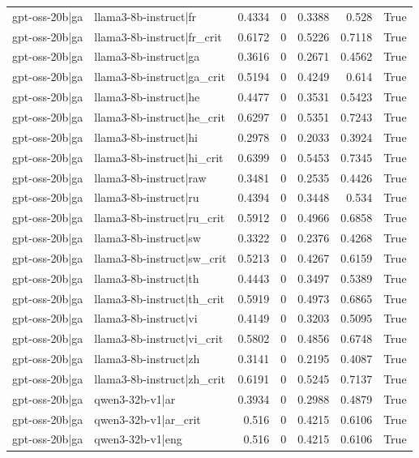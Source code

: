 \begin{table}
\begin{tabular}{l l r r r r l}
gpt-oss-20b|ga & llama3-8b-instruct|fr & 0.4334 & 0 & 0.3388 & 0.528 & True \\
gpt-oss-20b|ga & llama3-8b-instruct|fr_crit & 0.6172 & 0 & 0.5226 & 0.7118 & True \\
gpt-oss-20b|ga & llama3-8b-instruct|ga & 0.3616 & 0 & 0.2671 & 0.4562 & True \\
gpt-oss-20b|ga & llama3-8b-instruct|ga_crit & 0.5194 & 0 & 0.4249 & 0.614 & True \\
gpt-oss-20b|ga & llama3-8b-instruct|he & 0.4477 & 0 & 0.3531 & 0.5423 & True \\
gpt-oss-20b|ga & llama3-8b-instruct|he_crit & 0.6297 & 0 & 0.5351 & 0.7243 & True \\
gpt-oss-20b|ga & llama3-8b-instruct|hi & 0.2978 & 0 & 0.2033 & 0.3924 & True \\
gpt-oss-20b|ga & llama3-8b-instruct|hi_crit & 0.6399 & 0 & 0.5453 & 0.7345 & True \\
gpt-oss-20b|ga & llama3-8b-instruct|raw & 0.3481 & 0 & 0.2535 & 0.4426 & True \\
gpt-oss-20b|ga & llama3-8b-instruct|ru & 0.4394 & 0 & 0.3448 & 0.534 & True \\
gpt-oss-20b|ga & llama3-8b-instruct|ru_crit & 0.5912 & 0 & 0.4966 & 0.6858 & True \\
gpt-oss-20b|ga & llama3-8b-instruct|sw & 0.3322 & 0 & 0.2376 & 0.4268 & True \\
gpt-oss-20b|ga & llama3-8b-instruct|sw_crit & 0.5213 & 0 & 0.4267 & 0.6159 & True \\
gpt-oss-20b|ga & llama3-8b-instruct|th & 0.4443 & 0 & 0.3497 & 0.5389 & True \\
gpt-oss-20b|ga & llama3-8b-instruct|th_crit & 0.5919 & 0 & 0.4973 & 0.6865 & True \\
gpt-oss-20b|ga & llama3-8b-instruct|vi & 0.4149 & 0 & 0.3203 & 0.5095 & True \\
gpt-oss-20b|ga & llama3-8b-instruct|vi_crit & 0.5802 & 0 & 0.4856 & 0.6748 & True \\
gpt-oss-20b|ga & llama3-8b-instruct|zh & 0.3141 & 0 & 0.2195 & 0.4087 & True \\
gpt-oss-20b|ga & llama3-8b-instruct|zh_crit & 0.6191 & 0 & 0.5245 & 0.7137 & True \\
gpt-oss-20b|ga & qwen3-32b-v1|ar & 0.3934 & 0 & 0.2988 & 0.4879 & True \\
gpt-oss-20b|ga & qwen3-32b-v1|ar_crit & 0.516 & 0 & 0.4215 & 0.6106 & True \\
gpt-oss-20b|ga & qwen3-32b-v1|eng & 0.516 & 0 & 0.4215 & 0.6106 & True \\

\end{tabular}
\end{table}
